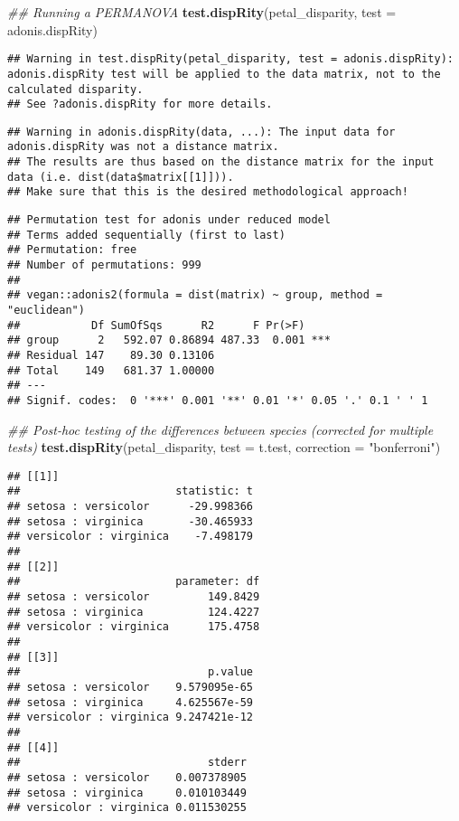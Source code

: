 \documentclass[
]{book}
\newenvironment{Shaded}{\begin{snugshade}}{\end{snugshade}}
\newcommand{\CommentTok}[1]{\textcolor[rgb]{0.56,0.35,0.01}{\textit{#1}}}
\newcommand{\DataTypeTok}[1]{\textcolor[rgb]{0.13,0.29,0.53}{#1}}
\newcommand{\KeywordTok}[1]{\textcolor[rgb]{0.13,0.29,0.53}{\textbf{#1}}}
\newcommand{\NormalTok}[1]{#1}
\newcommand{\StringTok}[1]{\textcolor[rgb]{0.31,0.60,0.02}{#1}}
\begin{document}
\begin{Shaded}
\begin{Highlighting}[]
\CommentTok{\#\# Running a PERMANOVA}
\KeywordTok{test.dispRity}\NormalTok{(petal\_disparity, }\DataTypeTok{test =}\NormalTok{ adonis.dispRity)}
\end{Highlighting}
\end{Shaded}

\begin{verbatim}
## Warning in test.dispRity(petal_disparity, test = adonis.dispRity): adonis.dispRity test will be applied to the data matrix, not to the calculated disparity.
## See ?adonis.dispRity for more details.
\end{verbatim}

\begin{verbatim}
## Warning in adonis.dispRity(data, ...): The input data for adonis.dispRity was not a distance matrix.
## The results are thus based on the distance matrix for the input data (i.e. dist(data$matrix[[1]])).
## Make sure that this is the desired methodological approach!
\end{verbatim}

\begin{verbatim}
## Permutation test for adonis under reduced model
## Terms added sequentially (first to last)
## Permutation: free
## Number of permutations: 999
## 
## vegan::adonis2(formula = dist(matrix) ~ group, method = "euclidean")
##           Df SumOfSqs      R2      F Pr(>F)    
## group      2   592.07 0.86894 487.33  0.001 ***
## Residual 147    89.30 0.13106                  
## Total    149   681.37 1.00000                  
## ---
## Signif. codes:  0 '***' 0.001 '**' 0.01 '*' 0.05 '.' 0.1 ' ' 1
\end{verbatim}

\begin{Shaded}
\begin{Highlighting}[]
\CommentTok{\#\# Post{-}hoc testing of the differences between species (corrected for multiple tests)}
\KeywordTok{test.dispRity}\NormalTok{(petal\_disparity, }\DataTypeTok{test =}\NormalTok{ t.test, }\DataTypeTok{correction =} \StringTok{"bonferroni"}\NormalTok{)}
\end{Highlighting}
\end{Shaded}

\begin{verbatim}
## [[1]]
##                        statistic: t
## setosa : versicolor      -29.998366
## setosa : virginica       -30.465933
## versicolor : virginica    -7.498179
## 
## [[2]]
##                        parameter: df
## setosa : versicolor         149.8429
## setosa : virginica          124.4227
## versicolor : virginica      175.4758
## 
## [[3]]
##                             p.value
## setosa : versicolor    9.579095e-65
## setosa : virginica     4.625567e-59
## versicolor : virginica 9.247421e-12
## 
## [[4]]
##                             stderr
## setosa : versicolor    0.007378905
## setosa : virginica     0.010103449
## versicolor : virginica 0.011530255
\end{verbatim}
\end{document}
